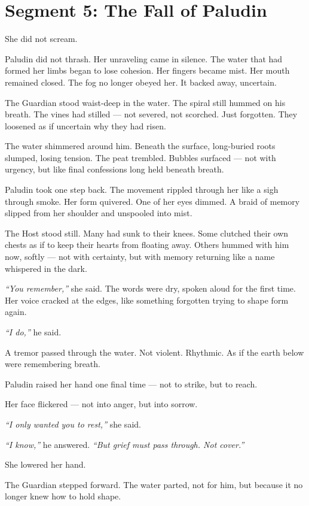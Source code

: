 \documentclass[9pt]{article}
\begin{document}
\section*{Segment 5: The Fall of Paludin}

She did not scream.

Paludin did not thrash. Her unraveling came in silence. The water that had formed her limbs began to lose cohesion. Her fingers became mist. Her mouth remained closed. The fog no longer obeyed her. It backed away, uncertain.

The Guardian stood waist-deep in the water. The spiral still hummed on his breath. The vines had stilled — not severed, not scorched. Just forgotten. They loosened as if uncertain why they had risen.

The water shimmered around him. Beneath the surface, long-buried roots slumped, losing tension. The peat trembled. Bubbles surfaced — not with urgency, but like final confessions long held beneath breath.

Paludin took one step back. The movement rippled through her like a sigh through smoke. Her form quivered. One of her eyes dimmed. A braid of memory slipped from her shoulder and unspooled into mist.

The Host stood still. Many had sunk to their knees. Some clutched their own chests as if to keep their hearts from floating away. Others hummed with him now, softly — not with certainty, but with memory returning like a name whispered in the dark.

\textit{``You remember,''} she said. The words were dry, spoken aloud for the first time. Her voice cracked at the edges, like something forgotten trying to shape form again.

\textit{``I do,''} he said.

A tremor passed through the water. Not violent. Rhythmic. As if the earth below were remembering breath.

Paludin raised her hand one final time — not to strike, but to reach.

Her face flickered — not into anger, but into sorrow.

\textit{``I only wanted you to rest,''} she said.

\textit{``I know,''} he answered. \textit{``But grief must pass through. Not cover.''}

She lowered her hand.

The Guardian stepped forward. The water parted, not for him, but because it no longer knew how to hold shape.
\end{document}

